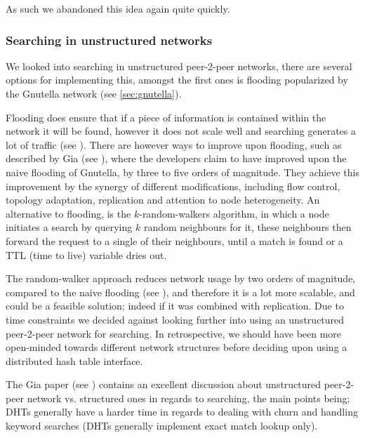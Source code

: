 As such we abandoned this idea again quite quickly.

\subsubsection{Searching in unstructured networks}
We looked into searching in unstructured peer-2-peer networks, there are
several options for implementing this, amongst the first ones is flooding
popularized by the Gnutella network (see \ref{sec:gnutella}).

Flooding does ensure that if a piece of information is contained within the 
network it will be found, however it does not scale well and searching 
generates a lot of traffic (see \citep{Lv:Searching}).
\newline
There are however ways to improve upon flooding, such as described by Gia 
(see \citep{Chawathe:Gia}), where the developers claim to have improved upon
the naive flooding of Gnutella, by three to five orders of magnitude.
They achieve this improvement by the synergy of different modifications,
including flow control, topology adaptation, replication and attention to node
heterogeneity.
\newline\newline
An alternative to flooding, is the $k$-random-walkers algorithm, in which a 
node initiates a search by querying $k$ random neighbours for it, these
neighbours then forward the request to a single of their neighbours, until a 
match is found or a TTL (time to live) variable dries out.

The random-walker approach reduces network usage by two orders of magnitude,
compared to the naive flooding (see \citep{Lv:Searching}), and therefore it is
a lot more scalable, and could be a feasible solution; indeed if it was
combined with replication.
\newline\newline
Due to time constraints we decided against looking further into using an
unstructured peer-2-peer network for searching. In retrospective, we should
have been more open-minded towards different network structures before deciding
upon using a distributed hash table interface.

The Gia paper (see \citep{Chawathe:Gia}) contains an excellent discussion about
unstructured peer-2-peer network vs. structured ones in regards to searching,
the main points being; \acs{DHT}s generally have a harder time in regards to dealing
with churn and handling keyword searches (\acs{DHT}s generally implement exact match
lookup only).

